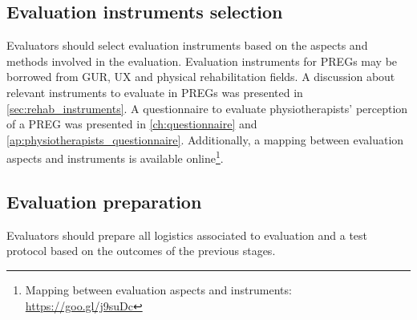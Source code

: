 \begin{table}[htb]
\caption{Evaluation methods for the game system layer over time}
\label{tab:methodsModelMappingGame}
\myfloatalign
{}
\end{table}

\subsection{Evaluation instruments selection}
Evaluators should select evaluation instruments based on the aspects and methods involved in the evaluation. Evaluation instruments for \acp{PREG} may be borrowed from \ac{GUR}, \ac{UX} and physical rehabilitation fields. A discussion about relevant instruments to evaluate in \acp{PREG} was presented in \autoref{sec:rehab_instruments}. A questionnaire to evaluate physiotherapists' perception of a \ac{PREG} was presented in \autoref{ch:questionnaire} and \autoref{ap:physiotherapists_questionnaire}. Additionally, a mapping between evaluation aspects and instruments is available online\footnote{Mapping between evaluation aspects and instruments: \url{https://goo.gl/j9suDc}}.

\subsection{Evaluation preparation}
Evaluators should prepare all logistics associated to evaluation and a test protocol based on the outcomes of the previous stages.

